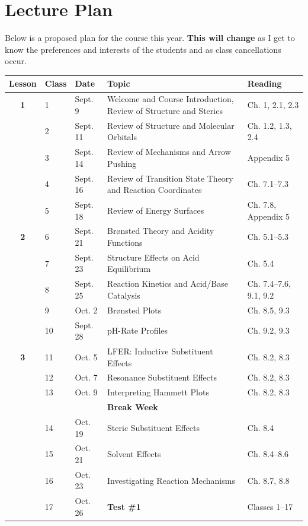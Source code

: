 \section{Lecture Plan}

Below is a proposed plan for the course this year. \textbf{This will change} as I get to know the preferences and interests of the students and as class cancellations occur.


\begin{longtable}{cp{0.8cm}p{1.8cm}p{7cm}p{3cm}}
\toprule
Lesson & Class & Date & Topic & Reading \\
\midrule
\textbf{1} & 1 & Sept. 9 & Welcome and Course Introduction, Review of Structure and Sterics & Ch. 1, 2.1, 2.3 \\
 & 2 & Sept. 11 & Review of Structure and Molecular Orbitals & Ch. 1.2, 1.3, 2.4 \\
 & 3 & Sept. 14 & Review of Mechanisms and Arrow Pushing & Appendix 5 \\
 & 4 & Sept. 16 & Review of Transition State Theory and Reaction Coordinates & Ch. 7.1--7.3 \\
 & 5 & Sept. 18 & Review of Energy Surfaces & Ch. 7.8, Appendix 5 \\
\textbf{2} & 6 & Sept. 21 & Brønsted Theory and Acidity Functions & Ch. 5.1--5.3 \\
 & 7 & Sept. 23 & Structure Effects on Acid Equilibrium & Ch. 5.4 \\
 & 8 & Sept. 25 & Reaction Kinetics and Acid/Base Catalysis & Ch. 7.4--7.6, 9.1, 9.2 \\
 & 9 & Oct. 2 & Brønsted Plots & Ch. 8.5, 9.3 \\
 & 10 & Sept. 28 & pH-Rate Profiles & Ch. 9.2, 9.3 \\
\textbf{3} & 11 & Oct. 5 & LFER: Inductive Substituent Effects & Ch. 8.2, 8.3 \\
 & 12 & Oct. 7 & Resonance Substituent Effects & Ch. 8.2, 8.3 \\
 & 13 & Oct. 9 & Interpreting Hammett Plots & Ch. 8.2, 8.3 \\
 & & & \textbf{Break Week} & \\
 & 14 & Oct. 19 & Steric Substituent Effects & Ch. 8.4 \\
 & 15 & Oct. 21 & Solvent Effects & Ch. 8.4--8.6 \\
 & 16 & Oct. 23 & Investigating Reaction Mechanisms & Ch. 8.7, 8.8 \\
 & 17 & Oct. 26 & \textbf{Test \#1} & Classes 1--17 \\
 

\end{longtable}

